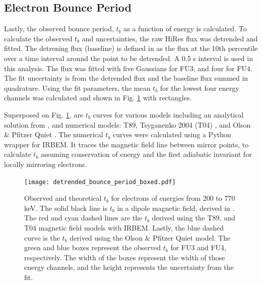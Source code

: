 \documentclass[draft,linenumbers]{agujournal}
\begin{document}
\subsection{Electron Bounce Period} \label{t_b} %
Lastly, the observed bounce period, $t_b$ as a function of energy is calculated. To calculate the observed $t_b$ and uncertainties, the raw HiRes flux was detrended and fitted. The detrening flux (baseline) is defined in \citet{O'Brien04} as the flux at the 10th percentile over a time interval around the point to be detrended. A 0.5 s interval is used in this analysis. The flux was fitted with five Gaussians for FU3, and four for FU4. The fit uncertainty is from the detrended flux and the baseline flux summed in quadrature. Using the fit parameters, the mean $t_b$ for the lowest four energy channels was calculated and shown in Fig. \ref{tb_plot} with rectangles. 

Superposed on Fig. \ref{tb_plot}, are $t_b$ curves for various models including an analytical solution from \citet{Schulz74}, and numerical models: T89, Tsyganenko 2004 (T04) \citep{Tsyganenko05}, and Olson \& Pfitzer Quiet \citep{Olson82}. The numerical $t_b$ curves were calculated using a Python wrapper for IRBEM. It traces the magnetic field line between mirror points, to calculate $t_b$ assuming conservation of energy and the first adiabatic invariant for locally mirroring electrons. 

%

\begin{figure}
\texttt{[image: detrended\_bounce\_period\_boxed.pdf]}
\caption{Observed and theoretical $t_b$ for electrons of energies from 200 to 770 keV. The solid black line is $t_b$ in a dipole magnetic field, derived in \citet{Schulz74}. The red and cyan dashed lines are the $t_b$ derived using the T89, and T04 magnetic field models with IRBEM. Lastly, the blue dashed curve is the $t_b$ derived using the Olson \& Pfitzer Quiet model. The green and blue boxes represent the observed $t_b$ for FU3 and FU4, respectively. The width of the boxes represent the width of those energy channels, and the height represents the uncertainty from the fit.}
\label{tb_plot}
\end{figure}
\end{document}
